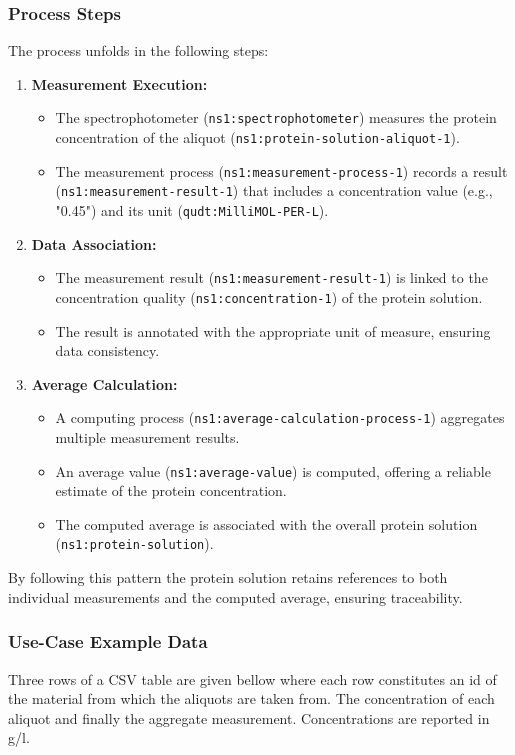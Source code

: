 \subsubsection{Process Steps}
The process unfolds in the following steps:
\begin{enumerate}[noitemsep]
    \item \textbf{Measurement Execution:}
    \begin{itemize}[noitemsep]
        \item The spectrophotometer (\texttt{ns1:spectrophotometer}) measures the protein concentration of the aliquot (\texttt{ns1:protein-solution-aliquot-1}).
        \item The measurement process (\texttt{ns1:measurement-process-1}) records a result (\texttt{ns1:measurement-result-1}) that includes a concentration value (e.g., "0.45") and its unit (\texttt{qudt:MilliMOL-PER-L}).
    \end{itemize}
    \item \textbf{Data Association:}
    \begin{itemize}[noitemsep]
        \item The measurement result (\texttt{ns1:measurement-result-1}) is linked to the concentration quality (\texttt{ns1:concentration-1}) of the protein solution.
        \item The result is annotated with the appropriate unit of measure, ensuring data consistency.
    \end{itemize}
    \item \textbf{Average Calculation:}
    \begin{itemize}[noitemsep]
        \item A computing process (\texttt{ns1:average-calculation-process-1}) aggregates multiple measurement results.
        \item An average value (\texttt{ns1:average-value}) is computed, offering a reliable estimate of the protein concentration.
        \item The computed average is associated with the overall protein solution (\texttt{ns1:protein-solution}).
    \end{itemize}
\end{enumerate}

By following this pattern the protein solution retains references to both individual measurements and the computed average, ensuring traceability. 


\subsubsection*{Use-Case Example Data}
Three rows of a CSV table are given bellow where each row constitutes an id of the material from which the aliquots are taken from. The concentration of each aliquot and finally the aggregate measurement. 
Concentrations are reported in g/l.

